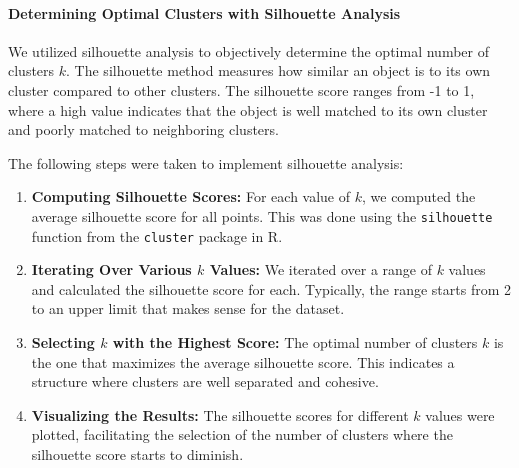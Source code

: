 \documentclass[8pt]{report}
\begin{document}
\paragraph{Determining Optimal Clusters with Silhouette Analysis}
We utilized silhouette analysis to objectively determine the optimal number of clusters \( k \). The silhouette method measures how similar an object is to its own cluster compared to other clusters. The silhouette score ranges from -1 to 1, where a high value indicates that the object is well matched to its own cluster and poorly matched to neighboring clusters.

The following steps were taken to implement silhouette analysis:

\begin{enumerate}
    \item \textbf{Computing Silhouette Scores:} For each value of \( k \), we computed the average silhouette score for all points. This was done using the \texttt{silhouette} function from the \texttt{cluster} package in R.
    
    \item \textbf{Iterating Over Various \( k \) Values:} We iterated over a range of \( k \) values and calculated the silhouette score for each. Typically, the range starts from 2 to an upper limit that makes sense for the dataset.
    
    \item \textbf{Selecting \( k \) with the Highest Score:} The optimal number of clusters \( k \) is the one that maximizes the average silhouette score. This indicates a structure where clusters are well separated and cohesive.
    
    \item \textbf{Visualizing the Results:} The silhouette scores for different \( k \) values were plotted, facilitating the selection of the number of clusters where the silhouette score starts to diminish.
\end{enumerate}
\end{document}

